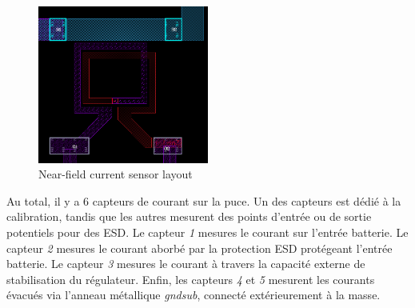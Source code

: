 \begin{figure}[!h]
  \centering
  \includegraphics[width=0.5\textwidth]{src/1/figures/sensor_layout.png}
  \caption{Near-field current sensor layout}
  \label{fig:near-field-current-sensor-layout}
\end{figure}

Au total, il y a 6 capteurs de courant sur la puce.
Un des capteurs est dédié à la calibration, tandis que les autres mesurent des points d'entrée ou de sortie potentiels pour des ESD.
Le capteur \textit{1} mesures le courant sur l'entrée batterie.
Le capteur \textit{2} mesures le courant aborbé par la protection ESD protégeant l'entrée batterie.
Le capteur \textit{3} mesures le courant à travers la capacité externe de stabilisation du régulateur.
Enfin, les capteurs \textit{4} et \textit{5} mesurent les courants évacués via l'anneau métallique \textit{gndsub}, connecté extérieurement à la masse.
